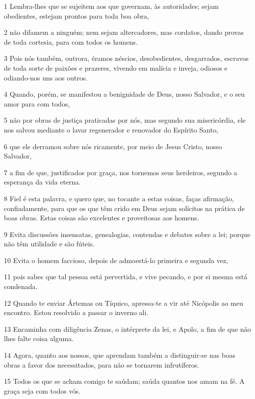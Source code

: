 \par 1 Lembra-lhes que se sujeitem aos que governam, às autoridades; sejam obedientes, estejam prontos para toda boa obra,
\par 2 não difamem a ninguém; nem sejam altercadores, mas cordatos, dando provas de toda cortesia, para com todos os homens.
\par 3 Pois nós também, outrora, éramos néscios, desobedientes, desgarrados, escravos de toda sorte de paixões e prazeres, vivendo em malícia e inveja, odiosos e odiando-nos uns aos outros.
\par 4 Quando, porém, se manifestou a benignidade de Deus, nosso Salvador, e o seu amor para com todos,
\par 5 não por obras de justiça praticadas por nós, mas segundo sua misericórdia, ele nos salvou mediante o lavar regenerador e renovador do Espírito Santo,
\par 6 que ele derramou sobre nós ricamente, por meio de Jesus Cristo, nosso Salvador,
\par 7 a fim de que, justificados por graça, nos tornemos seus herdeiros, segundo a esperança da vida eterna.
\par 8 Fiel é esta palavra, e quero que, no tocante a estas coisas, faças afirmação, confiadamente, para que os que têm crido em Deus sejam solícitos na prática de boas obras. Estas coisas são excelentes e proveitosas aos homens.
\par 9 Evita discussões insensatas, genealogias, contendas e debates sobre a lei; porque não têm utilidade e são fúteis.
\par 10 Evita o homem faccioso, depois de admoestá-lo primeira e segunda vez,
\par 11 pois sabes que tal pessoa está pervertida, e vive pecando, e por si mesma está condenada.
\par 12 Quando te enviar Ártemas ou Tíquico, apressa-te a vir até Nicópolis ao meu encontro. Estou resolvido a passar o inverno ali.
\par 13 Encaminha com diligência Zenas, o intérprete da lei, e Apolo, a fim de que não lhes falte coisa alguma.
\par 14 Agora, quanto aos nossos, que aprendam também a distinguir-se nas boas obras a favor dos necessitados, para não se tornarem infrutíferos.
\par 15 Todos os que se acham comigo te saúdam; saúda quantos nos amam na fé. A graça seja com todos vós.



